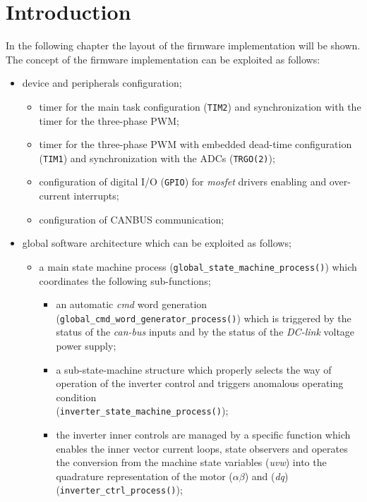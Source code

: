 \documentclass[11pt,a4paper,oneside]{book}
\numberwithin{equation}{section}
\theoremstyle{it}
\theoremstyle{definition}
\begin{document}
\section{Introduction}
In the following chapter the layout of the firmware implementation will be shown. The concept of the firmware implementation can be exploited as follows:
\begin{itemize}
	\item[--] device and peripherals configuration;
	\begin{itemize}
		\item[--] timer for the main task configuration ({\selectfont \verb+TIM2+}) and synchronization with the timer for the three-phase PWM;
		\item[--] timer for the three-phase PWM with embedded dead-time configuration ({\selectfont \verb+TIM1+}) and synchronization with the ADCs ({\selectfont \verb+TRGO(2)+});
		\item[--] configuration of digital I/O ({\selectfont \verb+GPIO+}) for \textit{mosfet} drivers enabling and over-current interrupts;
		\item[--] configuration of CANBUS communication;
	\end{itemize}
	\item[--] global software architecture which can be exploited as follows;
	\begin{itemize}
			\item[--] a main state machine process ({\selectfont \verb+global_state_machine_process()+}) which coordinates the following sub-functions;
			\begin{itemize}
				\item[--] an automatic \textit{cmd} word generation ({\selectfont \verb+global_cmd_word_generator_process()+}) which is triggered by the status of the \textit{can-bus} inputs and by the status of the \textit{DC-link} voltage power supply;
				\item[--] a sub-state-machine structure which properly selects the way of operation of the inverter control and triggers anomalous operating condition \\ ({\selectfont \verb+inverter_state_machine_process()+});
				\item[--] the inverter inner controls are managed by a specific function which enables the inner vector current loops, state observers and operates the conversion from the machine state variables (\textit{uvw}) into the quadrature representation of the motor ($\alpha\beta$) and (\textit{dq}) ({\selectfont \verb+inverter_ctrl_process()+});

\end{itemize}
\end{itemize}
\end{itemize}
\end{document}
